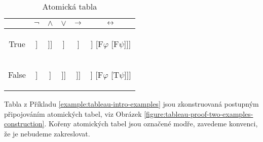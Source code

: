 \begin{table}[htbp]
\centering
\begin{tabular}{@{}c||c|c|c|c|c@{}}
 & $\neg$ & $\land$ & $\lor$ & $\mathbin{\rightarrow}$ & $\mathbin{\leftrightarrow}$  \\ \midrule \midrule
True
&
\begin{forest}
[$\mathrm{T}\neg\varphi$ [$\mathrm{F}\varphi$]]
\end{forest}
&
\begin{forest}
[$\mathrm{T}\varphi\land\psi$ [$\mathrm{T}\varphi$ [$\mathrm{T}\psi$]]]
\end{forest}
&
\begin{forest}
[$\mathrm{T}\varphi\lor\psi$ [$\mathrm{T}\varphi$] [$\mathrm{T}\psi$]]
\end{forest}
&
\begin{forest}
[$\mathrm{T}\varphi\limplies\psi$ [$\mathrm{F}\varphi$] [$\mathrm{T}\psi$]]
\end{forest}
&
\begin{forest}
[$\mathrm{T}\varphi\liff\psi$ [$\mathrm{T}\varphi$ [$\mathrm{T}\psi$]] [$\mathrm{F}\varphi$ [$\mathrm{F}\psi$]]]
\end{forest}
\\ \midrule
False
&
\begin{forest}
[$\mathrm{F}\neg\varphi$ [$\mathrm{T}\varphi$]]
\end{forest}
&
\begin{forest}
[$\mathrm{F}\varphi\land\psi$ [$\mathrm{F}\varphi$] [$\mathrm{F}\psi$]]
\end{forest}
&
\begin{forest}
[$\mathrm{F}\varphi\lor\psi$ [$\mathrm{F}\varphi$ [$\mathrm{F}\psi$]]]
\end{forest}
&
\begin{forest}
[$\mathrm{F}\varphi\limplies\psi$ [$\mathrm{T}\varphi$ [$\mathrm{F}\psi$]]]
\end{forest}
&
\begin{forest}
[$\mathrm{F}\varphi\liff\psi$ [$\mathrm{T}\varphi$ [$\mathrm{F}\psi$]] [$\mathrm{F}\varphi$ [$\mathrm{T}\psi$]]]
\end{forest}
\end{tabular}
\caption{Atomická tabla}
\label{table:atomic-tableaux}
\end{table}

Tabla z Příkladu \ref{example:tableau-intro-examples} jsou zkonstruovaná postupným připojováním atomických tabel, viz Obrázek \ref{figure:tableau-proof-two-examples-construction}. Kořeny atomických tabel jsou označené modře, zavedeme konvenci, že je nebudeme zakreslovat.

